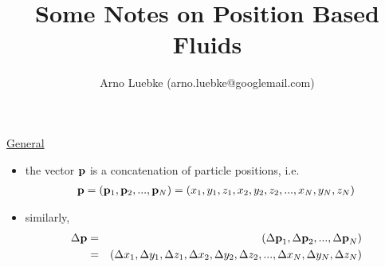 \documentclass[10pt]{article}
\title{Some Notes on Position Based Fluids}
\author{Arno Luebke (arno.luebke@googlemail.com)}
\date{}
\begin{document}
\maketitle
\underline{General}
\begin{itemize}
    \item the vector $\bf p$ is a concatenation of particle positions, i.e. 
        \begin{eqnarray*}
            {\bf p} = ({\bf p}_1, {\bf p}_2, ..., {\bf p}_N) = (x_1, y_1, z_1,  x_2, y_2, z_2,  ..., x_N, y_N, z_N)
        \end{eqnarray*}
    
    \item similarly,
        \begin{eqnarray*}
            {\Delta \bf p} &=& ({\Delta\bf p}_1, {\Delta\bf p}_2, ..., {\Delta\bf p}_N) \\
            &=& (\Delta x_1, \Delta y_1, \Delta z_1, \Delta x_2, \Delta y_2, \Delta z_2, ..., \Delta x_N, \Delta y_N, \Delta z_N)
        \end{eqnarray*}
        

\end{itemize}
\end{document}
